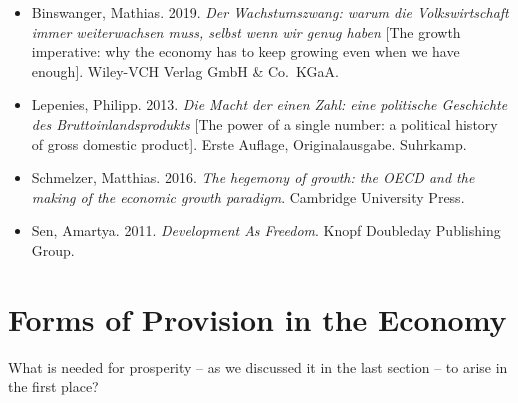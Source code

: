 \documentclass[
  british,
  a4paper,
  DIV=11,
  numbers=noendperiod,
  oneside,
  openany]{scrreprt}
\providecommand{\tightlist}{%
  \setlength{\itemsep}{0pt}\setlength{\parskip}{0pt}}
\begin{document}
\begin{tcolorbox}[enhanced jigsaw, arc=.35mm, bottomrule=.15mm, bottomtitle=1mm, breakable, colback=white, colbacktitle=quarto-callout-note-color!10!white, colframe=quarto-callout-note-color-frame, coltitle=black, left=2mm, leftrule=.75mm, opacityback=0, opacitybacktitle=0.6, rightrule=.15mm, title={Further reading}, titlerule=0mm, toprule=.15mm, toptitle=1mm]

\begin{itemize}
\tightlist
\item
  Binswanger, Mathias. 2019. \emph{Der Wachstumszwang: warum die
  Volkswirtschaft immer weiterwachsen muss, selbst wenn wir genug haben}
  {[}The growth imperative: why the economy has to keep growing even
  when we have enough{]}. Wiley-VCH Verlag GmbH \& Co.~KGaA.
\item
  Lepenies, Philipp. 2013. \emph{Die Macht der einen Zahl: eine
  politische Geschichte des Bruttoinlandsprodukts} {[}The power of a
  single number: a political history of gross domestic product{]}. Erste
  Auflage, Originalausgabe. Suhrkamp.
\item
  Schmelzer, Matthias. 2016. \emph{The hegemony of growth: the OECD and
  the making of the economic growth paradigm}. Cambridge University
  Press.
\item
  Sen, Amartya. 2011. \emph{Development As Freedom}. Knopf Doubleday
  Publishing Group.
\end{itemize}

\end{tcolorbox}

\section{Forms of Provision in the
Economy}\label{forms-of-provision-in-the-economy}

\begin{tcolorbox}[enhanced jigsaw, arc=.35mm, bottomrule=.15mm, bottomtitle=1mm, breakable, colback=white, colbacktitle=quarto-callout-note-color!10!white, colframe=quarto-callout-note-color-frame, coltitle=black, left=2mm, leftrule=.75mm, opacityback=0, opacitybacktitle=0.6, rightrule=.15mm, title={Guiding question}, titlerule=0mm, toprule=.15mm, toptitle=1mm]

What is needed for prosperity -- as we discussed it in the last section
-- to arise in the first place?

\end{tcolorbox}
\end{document}
